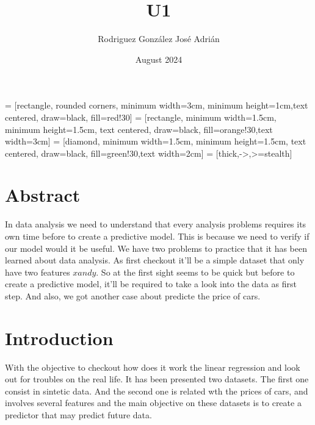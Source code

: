 \documentclass{article}
\title{U1}
\author{Rodriguez González José Adrián }
\date{August 2024}
\begin{document}
\maketitle
{} = [rectangle, rounded corners, minimum width=3cm, minimum height=1cm,text centered, draw=black, fill=red!30]
 = [rectangle, minimum width=1.5cm, minimum height=1.5cm, text centered, draw=black, fill=orange!30,text width=3cm]
 = [diamond,  minimum width=1.5cm, minimum height=1.5cm, text centered, draw=black, fill=green!30,text width=2cm]
 = [thick,->,>=stealth]
\section{Abstract}
In data analysis we need to understand that every analysis problems requires its own time before to create a predictive model. This is because we need to verify if our model would it be useful.
We have two problems to practice that it has been learned about data analysis. As first checkout it'll be a simple dataset that only have two features \(x and y\). So at the first sight seems to be quick but before to create a predictive model, it'll be required to take a look into the data as first step. And also, we got another case about predicte the price of cars.
\section{Introduction}
With the objective to checkout how does it work the linear regression and look out for troubles on the real life. It has been presented two datasets. The first one consist in sintetic data.
And the second one is related wth the prices of cars, and involves several features and the main objective on these datasets is to create a predictor that may predict future data.
\end{document}
